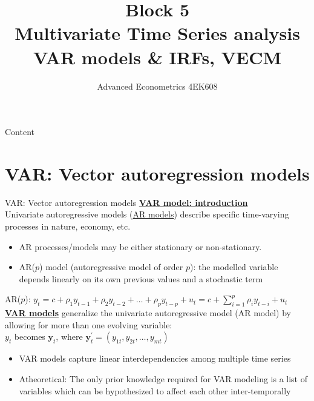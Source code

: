 \documentclass[usenames,dvipsnames]{beamer}
\title[Block 5]{Block 5\\ Multivariate Time Series analysis\\ VAR models \& IRFs, VECM}
\author{Advanced Econometrics 4EK608}
\institute{Vysoká škola ekonomická v Praze}
\date{}
\begin{document}
 
\begin{frame}
  \titlepage
\end{frame}

\begin{frame}{Content}
  \tableofcontents
\end{frame}

\section{VAR: Vector autoregression models}
\begin{frame}{VAR: Vector autoregression models}
\footnotesize
\underline{\textbf{VAR model: introduction}}\\
\bigskip
Univariate autoregressive models (\underline{AR models}) describe specific time-varying processes in nature, economy, etc.
\begin{itemize}
\item AR processes/models may be either stationary or non-stationary.
\item AR($p$) model (autoregressive model of order $p$): the modelled variable depends linearly on its own previous values and a stochastic term
\end{itemize}
\medskip
AR($p$): $y_t = c + \rho_1 y_{t-1} + \rho_2 y_{t-2} + \dots + \rho_p y_{t-p} + u_t = c + \sum_{i=1}^p \rho_i y_{t-i} + u_t$ \\
\bigskip
\underline{\textbf{VAR models}} generalize the univariate autoregressive model (AR model) by allowing for more than one evolving variable:\\ $y_t$ becomes $\bm{y}_t$, where $\bm{y}_t^{\prime} = (y_{1t}, y_{2t}, \dots , y_{mt})$\\
\begin{itemize}
\item VAR models capture linear interdependencies among multiple time series 
\item Atheoretical: The only prior knowledge required for VAR modeling is a list of variables which can be hypothesized to affect each other inter-temporally
\end{itemize}
\end{frame}
\end{document}
